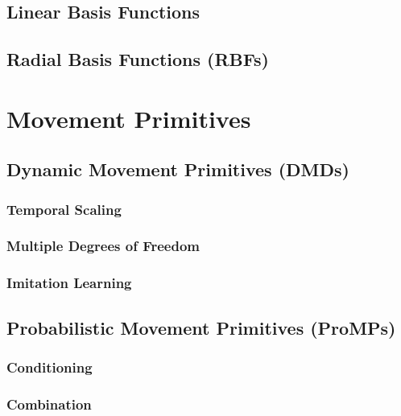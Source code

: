 		\subsection{Linear Basis Functions} %

		\subsection{Radial Basis Functions (RBFs)} %

	\section{Movement Primitives} %

		\subsection{Dynamic Movement Primitives (DMDs)} %

			\subsubsection{Temporal Scaling} %

			\subsubsection{Multiple Degrees of Freedom} %

			\subsubsection{Imitation Learning} %

		\subsection{Probabilistic Movement Primitives (ProMPs)} %

			\subsubsection{Conditioning} %

			\subsubsection{Combination} %

